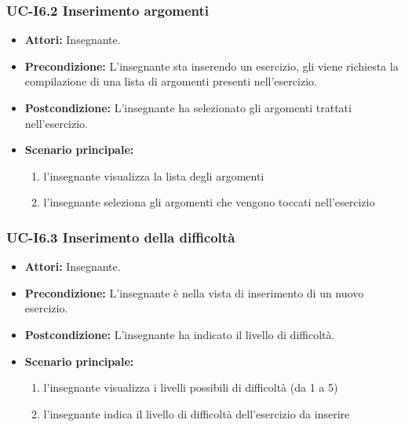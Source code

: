 \subsubsection{UC-I6.2 Inserimento argomenti}
\begin{itemize}
\item \textbf{Attori: }Insegnante.

\item \textbf{Precondizione:} L'insegnante sta inserendo un esercizio, gli viene richiesta la compilazione di una lista di argomenti presenti nell'esercizio.
\item \textbf{Postcondizione:} L'insegnante ha selezionato gli argomenti trattati nell'esercizio.
\item \textbf{Scenario principale: }
		\begin{enumerate}
		\item l'insegnante visualizza la lista degli argomenti
		\item l'insegnante seleziona gli argomenti che vengono toccati nell'esercizio
		\end{enumerate}
\end{itemize}				

\subsubsection{UC-I6.3 Inserimento della difficoltà}
\begin{itemize}
	\item \textbf{Attori: }Insegnante.
	\item \textbf{Precondizione:} L'insegnante è nella vista di inserimento di un nuovo esercizio.
	\item \textbf{Postcondizione:} L'insegnante ha indicato il livello di difficoltà.
	\item \textbf{Scenario principale:}
	\begin{enumerate}
		\item l'insegnante visualizza i livelli possibili di difficoltà (da 1 a 5)
		\item l'insegnante indica il livello di difficoltà dell'esercizio da inserire
	\end{enumerate}
\end{itemize}

